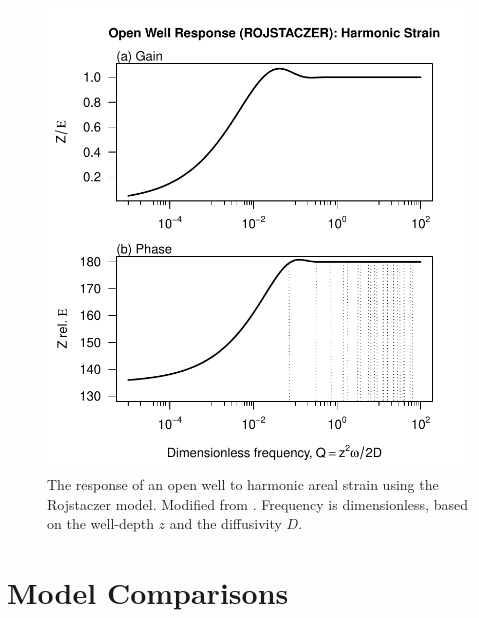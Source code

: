 \documentclass[12pt]{article}\usepackage[]{graphicx}\usepackage[]{color}
\makeatletter
\def\maxwidth{ %
  \ifdim\Gin@nat@width>\linewidth
    \linewidth
  \else
    \Gin@nat@width
  \fi
}
\newenvironment{knitrout}{}{} %
\makeatother
\begin{document}
\begin{figure}[htb!]
\begin{center}
\begin{knitrout}\small
{}\color{fgcolor}
\includegraphics[width=\maxwidth]{figure/ROJRESPFIG-1} 

\end{knitrout}
\caption{The response of an open well to harmonic areal strain using
the Rojstaczer model. Modified from \citet[][Fig.~3]{rojstaczer1988}.
Frequency is dimensionless, based on the well-depth $z$ and the diffusivity
$D$.}
\label{fig:owrsp-roj}
\end{center}
\end{figure}

\clearpage
\section{Model Comparisons}
\end{document}
